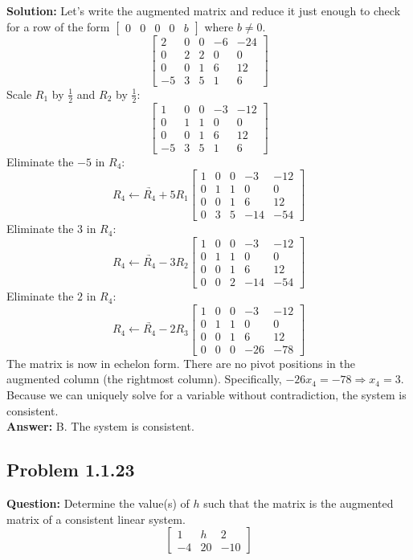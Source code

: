 \documentclass[11pt]{article}
\begin{document}
\textbf{Solution:}
Let's write the augmented matrix and reduce it just enough to check for a row of the form $\begin{bmatrix} 0 & 0 & 0 & 0 & b \end{bmatrix}$ where $b \neq 0$.
\[
\begin{bmatrix}
2 & 0 & 0 & -6 & -24 \\
0 & 2 & 2 & 0 & 0 \\
0 & 0 & 1 & 6 & 12 \\
-5 & 3 & 5 & 1 & 6
\end{bmatrix}
\]
Scale $R_1$ by $\frac{1}{2}$ and $R_2$ by $\frac{1}{2}$:
\[
\begin{bmatrix}
1 & 0 & 0 & -3 & -12 \\
0 & 1 & 1 & 0 & 0 \\
0 & 0 & 1 & 6 & 12 \\
-5 & 3 & 5 & 1 & 6
\end{bmatrix}
\]
Eliminate the $-5$ in $R_4$:
\[
\underrightarrow{R_4 \leftarrow R_4 + 5R_1}
\begin{bmatrix}
1 & 0 & 0 & -3 & -12 \\
0 & 1 & 1 & 0 & 0 \\
0 & 0 & 1 & 6 & 12 \\
0 & 3 & 5 & -14 & -54
\end{bmatrix}
\]
Eliminate the $3$ in $R_4$:
\[
\underrightarrow{R_4 \leftarrow R_4 - 3R_2}
\begin{bmatrix}
1 & 0 & 0 & -3 & -12 \\
0 & 1 & 1 & 0 & 0 \\
0 & 0 & 1 & 6 & 12 \\
0 & 0 & 2 & -14 & -54
\end{bmatrix}
\]
Eliminate the $2$ in $R_4$:
\[
\underrightarrow{R_4 \leftarrow R_4 - 2R_3}
\begin{bmatrix}
1 & 0 & 0 & -3 & -12 \\
0 & 1 & 1 & 0 & 0 \\
0 & 0 & 1 & 6 & 12 \\
0 & 0 & 0 & -26 & -78
\end{bmatrix}
\]
The matrix is now in echelon form. There are no pivot positions in the augmented column (the rightmost column). Specifically, $-26x_4 = -78 \Rightarrow x_4 = 3$. Because we can uniquely solve for a variable without contradiction, the system is consistent.
\\
\textbf{Answer:} B. The system is consistent.


\subsection*{Problem 1.1.23}
\textbf{Question:} Determine the value(s) of $h$ such that the matrix is the augmented matrix of a consistent linear system.
\[
\begin{bmatrix}
1 & h & 2 \\
-4 & 20 & -10
\end{bmatrix}
\]
\end{document}
